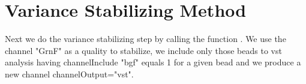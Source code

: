 \section{Variance Stabilizing Method}
Next we do the variance stabilizing step by calling the function . We use the channel "GrnF" as a quality to stabilize, we include only those beads to vst analysis having channelInclude "bgf" equals 1 for a given bead and we produce a new channel channelOutput="vst".